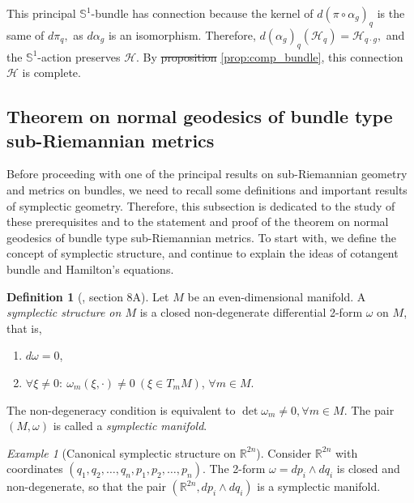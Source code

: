 \documentclass[12pt, letterpaper, reqno]{amsart}
\theoremstyle{definition}
\newtheorem{df}{Definition}
\theoremstyle{plain}
\theoremstyle{remark}
\newtheorem{ex}{Example}
\providecommand{\DIFadd}[1]{{\protect\color{blue}\uwave{#1}}} %
\providecommand{\DIFdel}[1]{{\protect\color{red}\sout{#1}}}                      %
\providecommand{\DIFaddbegin}{} %
\providecommand{\DIFaddend}{} %
\providecommand{\DIFdelbegin}{} %
\providecommand{\DIFdelend}{} %
\newcommand{\DIFscaledelfig}{0.5}
\newlength{\DIFdelgraphicswidth} %
\newlength{\DIFdelgraphicsheight} %
\newcommand{\DIFaddincludegraphics}[2][]{{\color{blue}\fbox{\DIFOincludegraphics[#1]{#2}}}} %
\newcommand{\DIFdelincludegraphics}[2][]{%
\sbox{\DIFdelgraphicsbox}{\DIFOincludegraphics[#1]{#2}}%
\settoboxwidth{\DIFdelgraphicswidth}{\DIFdelgraphicsbox} %
\settoboxtotalheight{\DIFdelgraphicsheight}{\DIFdelgraphicsbox} %
\scalebox{\DIFscaledelfig}{%
\parbox[b]{\DIFdelgraphicswidth}{\usebox{\DIFdelgraphicsbox}\\[-\baselineskip] \rule{\DIFdelgraphicswidth}{0em}}\llap{\resizebox{\DIFdelgraphicswidth}{\DIFdelgraphicsheight}{%
\setlength{\unitlength}{\DIFdelgraphicswidth}%
\begin{picture}(1,1)%
\thicklines\linethickness{2pt} %
{\color[rgb]{1,0,0}\put(0,0){\framebox(1,1){}}}%
{\color[rgb]{1,0,0}\put(0,0){\line( 1,1){1}}}%
{\color[rgb]{1,0,0}\put(0,1){\line(1,-1){1}}}%
\end{picture}%
}\hspace*{3pt}}} %
} %
\DeclareRobustCommand{\DIFaddbegin}{\DIFOaddbegin \let\includegraphics\DIFaddincludegraphics} %
\DeclareRobustCommand{\DIFaddend}{\DIFOaddend \let\includegraphics\DIFOincludegraphics} %
\DeclareRobustCommand{\DIFdelbegin}{\DIFOdelbegin \let\includegraphics\DIFdelincludegraphics} %
\DeclareRobustCommand{\DIFdelend}{\DIFOaddend \let\includegraphics\DIFOincludegraphics} %
\begin{document}
	This principal $ \mathbb{S}^1$-bundle has connection because the kernel of $ d(\pi\circ \alpha_g)_q $ is the same of $ d\pi_q, $ as $ d\alpha_g $ is an isomorphism. Therefore, $ d(\alpha_g)_q ( \mathcal{H}_q) = \mathcal{H}_{q\cdot g}, $ and the $ \mathbb{S}^1 $-action preserves $ \mathcal{H}. $ By \DIFdelbegin \DIFdel{proposition }\DIFdelend \DIFaddbegin \DIFadd{Proposition }\DIFaddend \ref{prop:comp_bundle}, this connection $ \mathcal{H} $ is complete.  

\subsection{Theorem on normal geodesics of bundle type sub-Riemannian metrics}
\label{sub:theorem_on_normal_geodesics}
Before proceeding with one of the principal results on sub-Riemannian geometry and metrics on bundles, we need to recall some definitions and important results of symplectic geometry. Therefore, this subsection is dedicated to the study of these prerequisites and to the statement and proof of the theorem on normal geodesics of bundle type sub-Riemannian metrics. To start with, we define the concept of symplectic structure, and continue to explain the ideas of cotangent bundle and Hamilton's equations.
\begin{df}[\cite{arnol2013mathematical}, section 8A]
	Let $ M $ be an even-dimensional manifold. A \textit{symplectic structure on $ M $ } is a closed non-degenerate differential 2-form $ \omega $ on $ M $, that is, 
	\begin{enumerate}
		\item $ d\omega=0 $,
		\item $\forall \xi \neq 0: \ \omega_m(\xi,\cdot)\neq0 \ (\xi\in T_m M)$, $ \forall m \in M. $  

	\end{enumerate}
	The non-degeneracy condition is equivalent to $ \operatorname{det} \omega_m\neq 0, \forall m\in M $. The pair $ (M,\omega) $ is called a \textit{symplectic manifold}. 
\end{df}

\begin{ex}[Canonical symplectic structure on $ \mathbb{R}^{2n}$]
	Consider $ \mathbb{R}^{2n} $ with coordinates $ (q_1,q_2,\dots,q_n,p_1,p_2,\dots,p_n) $. The 2-form $ \omega = dp_i\wedge dq_i $ is closed and non-degenerate, so that the pair $ ( \mathbb{R}^{2n}, dp_i\wedge dq_i) $ is a symplectic manifold.  
\end{ex}
\end{document}

